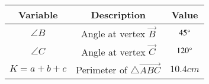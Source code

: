 \begin{tabular}[12pt]{ |c|c|c|}
    \hline
	\textbf{Variable} & \textbf{Description} & \textbf{Value} \\ 
    \hline
    $\angle B$ & Angle at vertex $\vec{B}$ & $45\degree$ \\
    \hline 
    $\angle C$ & Angle at vertex $\vec{C}$ & $120\degree$ \\
    \hline
    $K=a+b+c$ & Perimeter of $\triangle\vec{ABC}$ & $10.4cm$ \\
    \hline
\end{tabular}
